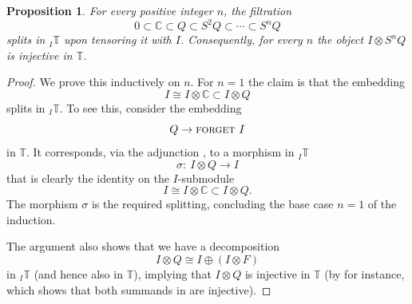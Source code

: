 \documentclass[11pt]{article}
\theoremstyle{plain}
\newtheorem{proposition}[lemma]{Proposition}
\theoremstyle{nonumberplain}
\theoremstyle{plain}
\numberwithin{equation}{section}
\theoremstyle{nonumberplain}
\newtheorem{proof}{Proof}
\newcommand\bC{{\mathbb C}}
\newcommand\bT{{\mathbb T}}
\newcommand\1{{\bf 1}}
\newcommand{\cat}[1]{\textsc{#1}}
\begin{document}
\begin{proposition}\label{pr:ss}
  For every positive integer $n$, the filtration
  \begin{equation*}
    0\subset \bC\subset Q\subset S^2Q\subset\cdots\subset S^nQ
  \end{equation*}
  splits in ${}_I\bT$ upon tensoring it with $I$. Consequently, for every $n$ the object $I\otimes S^nQ$ is injective in $\bT$. 
\end{proposition}
\begin{proof}
  We prove this inductively on $n$. For $n=1$ the claim is that the embedding
  \begin{equation*}
    I\cong I\otimes \bC\subset I\otimes Q
  \end{equation*}
  splits in ${}_I\bT$. To see this, consider the embedding
  \begin{equation*}
    Q\to \cat{forget}~I
  \end{equation*}
  in $\bT$. It corresponds, via the adjunction , to a morphism in $_I\bT$
  \begin{equation*}
    {\sigma:}\ I\otimes Q\to I
  \end{equation*}
  that is clearly the identity on the $I$-submodule
  \begin{equation*}
    I\cong I\otimes \bC\subset I\otimes Q.
  \end{equation*}
  The morphism $\sigma$ is the required splitting, concluding the base case $n=1$ of the induction.

  The argument also shows that we have a decomposition
  \begin{equation}\label{eq:iqiif}
    I\otimes Q\cong I\oplus (I\otimes F) 
  \end{equation}
  in ${}_I\bT$ (and hence also in $\bT$), implying that $I\otimes Q$ is injective in $\bT$ (by  for instance, which shows that both summands in  are injective).


\end{proof}
\end{document}
